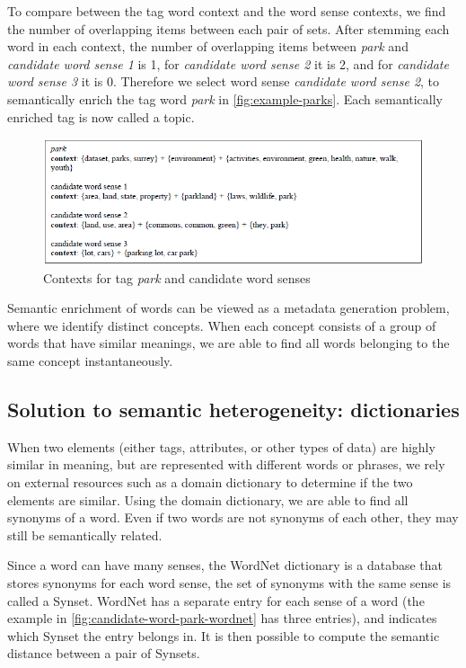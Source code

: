 To compare between the tag word context and the word sense contexts, we find the number of overlapping items between each pair of sets. After stemming each word in each context, the number of overlapping items between \textit{park} and \textit{candidate word sense 1} is 1, for \textit{candidate word sense 2} it is 2, and for \textit{candidate word sense 3} it is 0. Therefore we select word sense \textit{candidate word sense 2}, to semantically enrich the tag word \textit{park} in \autoref{fig:example-parks}. Each semantically enriched tag is now called a topic.

\begin{figure}
    \centering
    \includegraphics[width=5in]{figures/contexts-park-candidate.png}
    \caption{Contexts for tag \textit{park} and candidate word senses}
    \label{fig:contexts-park-candidate}
\end{figure}

Semantic enrichment of words can be viewed as a metadata generation problem, where we identify distinct concepts. When each concept consists of a group of words that have similar meanings, we are able to find all words belonging to the same concept instantaneously.

\subsection{Solution to semantic heterogeneity: dictionaries}
\label{ssec:SolutionToSemanticHeterogeneityDdictionaries}

When two elements (either tags, attributes, or other types of data) are highly similar in meaning, but are represented with different words or phrases, we rely on external resources such as a domain dictionary to determine if the two elements are similar. Using the domain dictionary, we are able to find all synonyms of a word. Even if two words are not synonyms of each other, they may still be semantically related.

Since a word can have many senses, the WordNet dictionary is a database that stores synonyms for each word sense, the set of synonyms with the same sense is called a Synset. WordNet has a separate entry for each sense of a word (the example in \autoref{fig:candidate-word-park-wordnet} has three entries), and indicates which Synset the entry belongs in. It is then possible to compute the semantic distance between a pair of Synsets.

